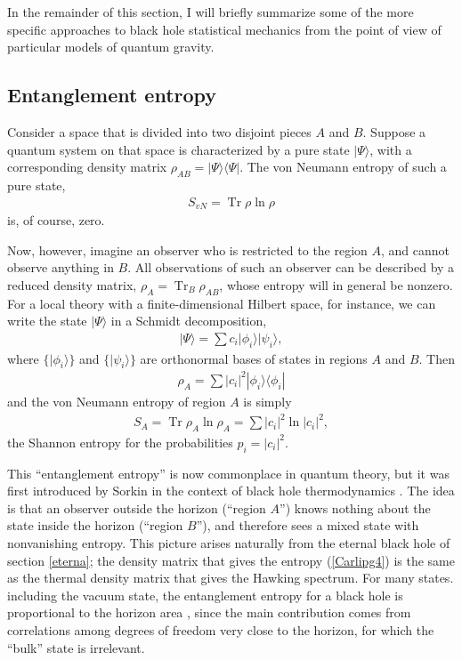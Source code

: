\documentclass[12pt]{article}
\begin{document}
In  the remainder of this section, I will briefly summarize some of
the more specific approaches to black hole statistical mechanics from
the point of view of particular models of quantum gravity.

\subsection{Entanglement entropy}

Consider a space that is divided into two disjoint pieces  $A$
and $B$.  Suppose a quantum system on that space is 
characterized by a pure state $|\Psi\rangle$, with a corresponding
density matrix $\rho_{AB} = |\Psi\rangle\langle\Psi|$.  The von
Neumann entropy of such a pure state,
\begin{align}
S_{vN} = \mathop{Tr} \rho \ln\rho 
\label{Carlipg1}
\end{align}
is, of course, zero.

Now, however, imagine an observer who is restricted to the region $A$,
and cannot observe anything in $B$.  All observations of such an 
observer can be described by a reduced density matrix,
$\rho_A = \mathop{Tr}_B\rho_{AB}$, whose entropy will in general 
be nonzero.  For a local theory with a finite-dimensional Hilbert space,
for instance, we can write the state $|\Psi\rangle$ in a Schmidt
decomposition,
\begin{align}
|\Psi\rangle = \sum c_i |\phi_i\rangle|\psi_i\rangle  ,
\label{Carlipg2}
\end{align}
where $\{|\phi_i\rangle\}$ and $\{|\psi_i\rangle\}$ are orthonormal
bases of states in regions $A$ and $B$.  Then
\begin{align}
\rho_A = \sum |c_i|^2|\phi_i\rangle\langle\phi_i|
\label{Carlipg3}
\end{align}
and the von Neumann entropy of region $A$ is simply
\begin{align}
S_A = \mathop{Tr} \rho_A \ln\rho_A = \sum |c_i|^2\ln|c_i|^2 ,
\label{Carlipg4}
\end{align}
the Shannon entropy for the probabilities $p_i = |c_i|^2$.

This ``entanglement entropy'' is now commonplace in quantum theory,
but it was first introduced by Sorkin in the context of black hole
thermodynamics \cite{Sorkin}.  The idea is that an observer outside
the horizon (``region $A$'') knows nothing about the state inside
the horizon (``region $B$''), and therefore sees a mixed state with
nonvanishing entropy.  This picture arises naturally from the eternal
black hole of section \ref{eterna}; the 
density matrix that gives the entropy (\ref{Carlipg4}) is the same as
the thermal density matrix that gives the Hawking spectrum.   For
many states. including the vacuum state, the entanglement entropy
for a black hole is proportional to the horizon area \cite{Sorkin,Bomb,Sred,FroNov},
since the main contribution comes from correlations among degrees
of freedom very close to the horizon, for which the ``bulk'' state
is irrelevant.
\end{document}
